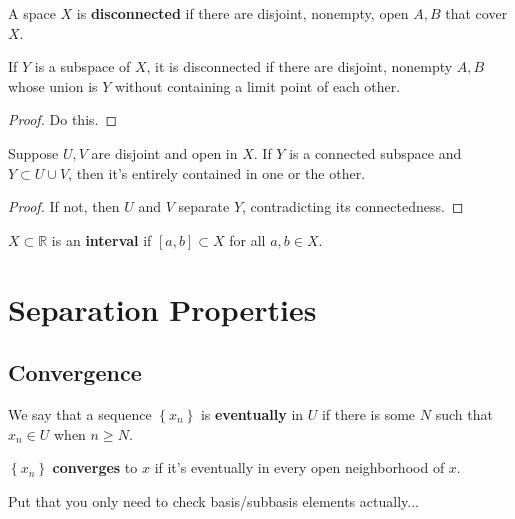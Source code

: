 \documentclass[10pt]{report}
\begin{document}
\begin{defn}[]
A space $X$ is \textbf{disconnected} if there are disjoint, nonempty, open $A,B$ that cover $X$.
\end{defn}

\begin{prop}
If $Y$ is a subspace of $X$, it is disconnected if there are disjoint, nonempty $A,B$ whose union is $Y$ without containing a limit point of each other.
\end{prop}
\begin{proof}
	{\color{red}Do this.}
\end{proof}

\begin{lem}
	Suppose $U,V$ are disjoint and open in $X$. If $Y$ is a connected subspace and $Y \subset U \cup V$, then it's entirely contained in one or the other.
\end{lem}
\begin{proof}
	If not, then $U$ and $V$ separate $Y$, contradicting its connectedness.
\end{proof}

\begin{defn}[]
	$X \subset \mathbb{R}$ is an \textbf{interval} if $[a,b] \subset X$ for all $a,b \in X$.
\end{defn}




\chapter{Separation Properties}


\section{Convergence}

We say that a sequence $\left\{ x_n \right\}$ is \textbf{eventually} in $U$ if there is some $N$ such that $x_n \in U$ when $n \geq N$.

\begin{defn}[]
$\left\{ x_n \right\}$ \textbf{converges} to $x$ if it's eventually in every open neighborhood of $x$.
\end{defn}

{\color{red}Put that you only need to check basis/subbasis elements actually...}
\end{document}
